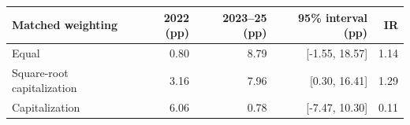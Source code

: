 \begin{tabular}{lrrrr}
\toprule
Matched weighting & 2022 (pp) & 2023--25 (pp) & 95\% interval (pp) & IR \\
\midrule
Equal & 0.80 & 8.79 & [-1.55, 18.57] & 1.14 \\
Square-root capitalization & 3.16 & 7.96 & [0.30, 16.41] & 1.29 \\
Capitalization & 6.06 & 0.78 & [-7.47, 10.30] & 0.11 \\
\bottomrule
\end{tabular}

